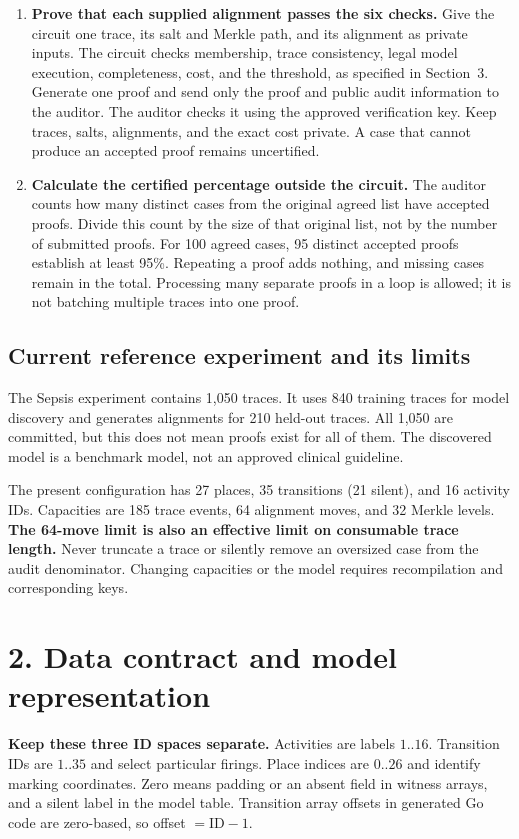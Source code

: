 \documentclass[10pt,a4paper]{article}
\newcommand{\must}[1]{\textbf{#1}}
\begin{document}
\begin{enumerate}
\item \must{Prove that each supplied alignment passes the six checks.}
Give the circuit one trace, its salt and Merkle path, and its alignment as private inputs. The circuit checks membership, trace consistency, legal model execution, completeness, cost, and the threshold, as specified in Section~3. Generate one proof and send only the proof and public audit information to the auditor. The auditor checks it using the approved verification key. Keep traces, salts, alignments, and the exact cost private. A case that cannot produce an accepted proof remains uncertified.

\item \must{Calculate the certified percentage outside the circuit.}
The auditor counts how many distinct cases from the original agreed list have accepted proofs. Divide this count by the size of that original list, not by the number of submitted proofs. For 100 agreed cases, 95 distinct accepted proofs establish at least 95\%. Repeating a proof adds nothing, and missing cases remain in the total. Processing many separate proofs in a loop is allowed; it is not batching multiple traces into one proof.

\end{enumerate}

\subsection*{Current reference experiment and its limits}
The Sepsis experiment contains 1,050 traces. It uses 840 training traces for model discovery and generates alignments for 210 held-out traces. All 1,050 are committed, but this does not mean proofs exist for all of them. The discovered model is a benchmark model, not an approved clinical guideline.

The present configuration has 27 places, 35 transitions (21 silent), and 16 activity IDs. Capacities are 185 trace events, 64 alignment moves, and 32 Merkle levels. \must{The 64-move limit is also an effective limit on consumable trace length.} Never truncate a trace or silently remove an oversized case from the audit denominator. Changing capacities or the model requires recompilation and corresponding keys.

\clearpage
\section*{2. Data contract and model representation}
\must{Keep these three ID spaces separate.} Activities are labels $1..16$. Transition IDs are $1..35$ and select particular firings. Place indices are $0..26$ and identify marking coordinates. Zero means padding or an absent field in witness arrays, and a silent label in the model table. Transition array offsets in generated Go code are zero-based, so offset $=\mathrm{ID}-1$.
\end{document}
